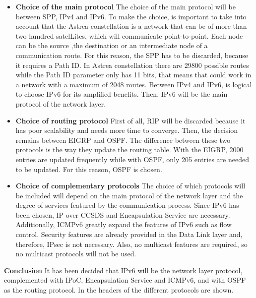 \begin{itemize}
\item \textbf{Choice of the main protocol}
The choice of the main protocol will be between SPP, IPv4 and IPv6. To make the choice, is important to take into account that the Astrea constellation is a network that can be of more than two hundred satelLites, which will communicate point-to-point. Each node can be the source ,the destination or an intermediate node of a communication route.
For this reason, the SPP has to be discarded, because it requires a Path ID. In Astrea constellation there are 29800 possible routes while the Path ID parameter only has 11 bits, that means that could work in a network with a maximum of 2048 routes. Between IPv4 and IPv6, is logical to choose IPv6 for its amplified benefits. Then, IPv6 will be the main protocol of the network layer. 
\item \textbf{Choice of routing protocol}
First of all, RIP will be discarded because it has poor scalability and needs more time to converge. Then, the decision remains between EIGRP and OSPF. The difference between these two protocols is the way they update the routing table. With the EIGRP, 2000 entries are updated frequently while with OSPF, only 205 entries are needed to be updated. For this reason, OSPF is chosen.
\item \textbf{Choice of complementary protocols}
The choice of which protocols will be included will depend on the main protocol of the network layer and the degree of services featured by the communication process.
Since IPv6 has been chosen, IP over CCSDS and Encapsulation Service are necessary. Additionally, ICMPv6 greatly expand the features of IPv6 such as flow control. Security features are already provided in the Data Link layer and, therefore, IPsec is not necessary. Also, no multicast features are required, so no multicast protocols will not be used.
\end{itemize}

\textbf{Conclusion}
It has been decided that IPv6 will be the network layer protocol, complemented with IPoC, Encapsulation Service and ICMPv6, and with OSPF as the routing protocol. In \cite[Chapter 1, Section 2]{annex3} the headers of the different protocols are shown. 